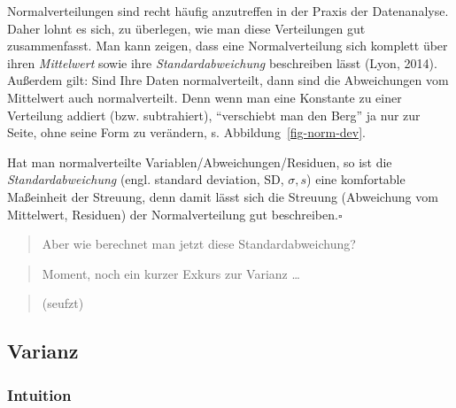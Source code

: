 \documentclass[
  letterpaper,
]{scrbook}
\theoremstyle{definition}
\theoremstyle{definition}
\theoremstyle{definition}
\theoremstyle{remark}
\begin{document}
Normalverteilungen sind recht häufig anzutreffen in der Praxis der
Datenanalyse. Daher lohnt es sich, zu überlegen, wie man diese
Verteilungen gut zusammenfasst. Man kann zeigen, dass eine
Normalverteilung sich komplett über ihren \emph{Mittelwert} sowie ihre
\emph{Standardabweichung} beschreiben lässt (Lyon, 2014). Außerdem gilt:
Sind Ihre Daten normalverteilt, dann sind die Abweichungen vom
Mittelwert auch normalverteilt. Denn wenn man eine Konstante zu einer
Verteilung addiert (bzw. subtrahiert), ``verschiebt man den Berg'' ja
nur zur Seite, ohne seine Form zu verändern, s.
Abbildung~\ref{fig-norm-dev}.

\begin{tcolorbox}[enhanced jigsaw, colbacktitle=quarto-callout-note-color!10!white, coltitle=black, bottomrule=.15mm, rightrule=.15mm, arc=.35mm, toptitle=1mm, colframe=quarto-callout-note-color-frame, opacitybacktitle=0.6, left=2mm, leftrule=.75mm, breakable, opacityback=0, bottomtitle=1mm, titlerule=0mm, title=\textcolor{quarto-callout-note-color}{\faInfo}\hspace{0.5em}{Hinweis}, colback=white, toprule=.15mm]

Hat man normalverteilte Variablen/Abweichungen/Residuen, so ist die
\emph{Standardabweichung} (engl. standard deviation, SD, \(\sigma, s\))
eine komfortable Maßeinheit der Streuung, denn damit lässt sich die
Streuung (Abweichung vom Mittelwert, Residuen) der Normalverteilung gut
beschreiben.\(\square\)

\end{tcolorbox}

\begin{quote}
{} Aber wie berechnet man jetzt diese Standardabweichung?
\end{quote}

\begin{quote}
{} Moment, noch ein kurzer Exkurs zur Varianz \ldots{}
\end{quote}

\begin{quote}
{} (seufzt)
\end{quote}

\subsection{Varianz}\label{varianz}

\subsubsection{Intuition}\label{intuition}
\end{document}
